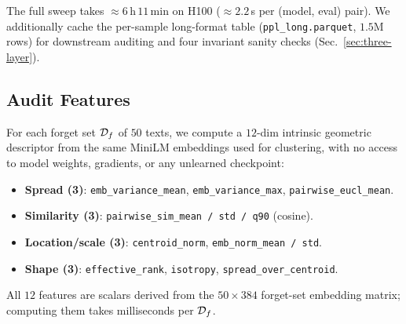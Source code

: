 The full sweep takes $\approx 6$\,h\,$11$\,min on H100 ($\approx 2.2$\,s per (model, eval) pair). We additionally cache the per-sample long-format table (\texttt{ppl\_long.parquet}, $1.5$M rows) for downstream auditing and four invariant sanity checks (Sec.~\ref{sec:three-layer}).

\subsection{Audit Features}
\label{sec:features}

For each forget set $\mathcal{D}_f$ of $50$ texts, we compute a $12$-dim intrinsic geometric descriptor from the same MiniLM embeddings used for clustering, with no access to model weights, gradients, or any unlearned checkpoint:
\begin{itemize}
    \setlength\itemsep{0.15em}
    \item \textbf{Spread (3)}: \texttt{emb\_variance\_mean}, \texttt{emb\_variance\_max}, \texttt{pairwise\_eucl\_mean}.
    \item \textbf{Similarity (3)}: \texttt{pairwise\_sim\_mean / std / q90} (cosine).
    \item \textbf{Location/scale (3)}: \texttt{centroid\_norm}, \texttt{emb\_norm\_mean / std}.
    \item \textbf{Shape (3)}: \texttt{effective\_rank}, \texttt{isotropy}, \texttt{spread\_over\_centroid}.
\end{itemize}
All $12$ features are scalars derived from the $50\times 384$ forget-set embedding matrix; computing them takes milliseconds per $\mathcal{D}_f$.
